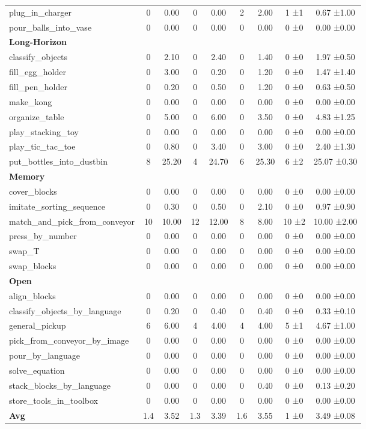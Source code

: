 \begin{table}[H]
{\begin{tabular}{l|c|c|c|c|c|c|c|c}
plug\_in\_charger & 0 & 0.00 & 0 & 0.00 & 2 & 2.00 & 1 ±1 & 0.67 ±1.00 \\
pour\_balls\_into\_vase & 0 & 0.00 & 0 & 0.00 & 0 & 0.00 & 0 ±0 & 0.00 ±0.00 \\
\hline
\multicolumn{9}{l}{\textbf{Long-Horizon}} \\
classify\_objects & 0 & 2.10 & 0 & 2.40 & 0 & 1.40 & 0 ±0 & 1.97 ±0.50 \\
fill\_egg\_holder & 0 & 3.00 & 0 & 0.20 & 0 & 1.20 & 0 ±0 & 1.47 ±1.40 \\
fill\_pen\_holder & 0 & 0.20 & 0 & 0.50 & 0 & 1.20 & 0 ±0 & 0.63 ±0.50 \\
make\_kong & 0 & 0.00 & 0 & 0.00 & 0 & 0.00 & 0 ±0 & 0.00 ±0.00 \\
organize\_table & 0 & 5.00 & 0 & 6.00 & 0 & 3.50 & 0 ±0 & 4.83 ±1.25 \\
play\_stacking\_toy & 0 & 0.00 & 0 & 0.00 & 0 & 0.00 & 0 ±0 & 0.00 ±0.00 \\
play\_tic\_tac\_toe & 0 & 0.80 & 0 & 3.40 & 0 & 3.00 & 0 ±0 & 2.40 ±1.30 \\
put\_bottles\_into\_dustbin & 8 & 25.20 & 4 & 24.70 & 6 & 25.30 & 6 ±2 & 25.07 ±0.30 \\
\hline
\multicolumn{9}{l}{\textbf{Memory}} \\
cover\_blocks & 0 & 0.00 & 0 & 0.00 & 0 & 0.00 & 0 ±0 & 0.00 ±0.00 \\
imitate\_sorting\_sequence & 0 & 0.30 & 0 & 0.50 & 0 & 2.10 & 0 ±0 & 0.97 ±0.90 \\
match\_and\_pick\_from\_conveyor & 10 & 10.00 & 12 & 12.00 & 8 & 8.00 & 10 ±2 & 10.00 ±2.00 \\
press\_by\_number & 0 & 0.00 & 0 & 0.00 & 0 & 0.00 & 0 ±0 & 0.00 ±0.00 \\
swap\_T & 0 & 0.00 & 0 & 0.00 & 0 & 0.00 & 0 ±0 & 0.00 ±0.00 \\
swap\_blocks & 0 & 0.00 & 0 & 0.00 & 0 & 0.00 & 0 ±0 & 0.00 ±0.00 \\
\hline
\multicolumn{9}{l}{\textbf{Open}} \\
align\_blocks & 0 & 0.00 & 0 & 0.00 & 0 & 0.00 & 0 ±0 & 0.00 ±0.00 \\
classify\_objects\_by\_language & 0 & 0.20 & 0 & 0.40 & 0 & 0.40 & 0 ±0 & 0.33 ±0.10 \\
general\_pickup & 6 & 6.00 & 4 & 4.00 & 4 & 4.00 & 5 ±1 & 4.67 ±1.00 \\
pick\_from\_conveyor\_by\_image & 0 & 0.00 & 0 & 0.00 & 0 & 0.00 & 0 ±0 & 0.00 ±0.00 \\
pour\_by\_language & 0 & 0.00 & 0 & 0.00 & 0 & 0.00 & 0 ±0 & 0.00 ±0.00 \\
solve\_equation & 0 & 0.00 & 0 & 0.00 & 0 & 0.00 & 0 ±0 & 0.00 ±0.00 \\
stack\_blocks\_by\_language & 0 & 0.00 & 0 & 0.00 & 0 & 0.40 & 0 ±0 & 0.13 ±0.20 \\
store\_tools\_in\_toolbox & 0 & 0.00 & 0 & 0.00 & 0 & 0.00 & 0 ±0 & 0.00 ±0.00 \\
\hline
\textbf{Avg} & 1.4 & 3.52 & 1.3 & 3.39 & 1.6 & 3.55 & 1 ±0 & 3.49 ±0.08 \\
\hline
\end{tabular}
}
\end{table}
